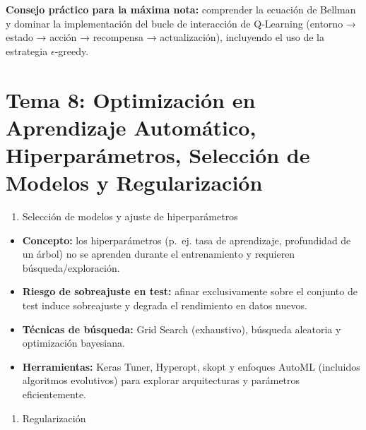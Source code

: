 \documentclass[12pt]{book} %
\providecommand{\tightlist}{%
  \setlength{\itemsep}{0pt}\setlength{\parskip}{0pt}}
\begin{document}
\textbf{Consejo práctico para la máxima nota:} comprender la ecuación de
Bellman y dominar la implementación del bucle de interacción de
Q‑Learning (entorno → estado → acción → recompensa → actualización),
incluyendo el uso de la estrategia \(\epsilon\)‑greedy.

\hypertarget{tema-8-optimizaciuxf3n-en-aprendizaje-automuxe1tico-hiperparuxe1metros-selecciuxf3n-de-modelos-y-regularizaciuxf3n}{%
\section{Tema 8: Optimización en Aprendizaje Automático,
Hiperparámetros, Selección de Modelos y
Regularización}\label{tema-8-optimizaciuxf3n-en-aprendizaje-automuxe1tico-hiperparuxe1metros-selecciuxf3n-de-modelos-y-regularizaciuxf3n}}

\begin{enumerate}
\def\labelenumi{\arabic{enumi}.}
\tightlist
\item
  Selección de modelos y ajuste de hiperparámetros
\end{enumerate}

\begin{itemize}
\tightlist
\item
  \textbf{Concepto:} los hiperparámetros (p.~ej. tasa de aprendizaje,
  profundidad de un árbol) no se aprenden durante el entrenamiento y
  requieren búsqueda/exploración.
\item
  \textbf{Riesgo de sobreajuste en test:} afinar exclusivamente sobre el
  conjunto de test induce sobreajuste y degrada el rendimiento en datos
  nuevos.
\item
  \textbf{Técnicas de búsqueda:} Grid Search (exhaustivo), búsqueda
  aleatoria y optimización bayesiana.
\item
  \textbf{Herramientas:} Keras Tuner, Hyperopt, skopt y enfoques AutoML
  (incluidos algoritmos evolutivos) para explorar arquitecturas y
  parámetros eficientemente.
\end{itemize}

\begin{enumerate}
\def\labelenumi{\arabic{enumi}.}
\setcounter{enumi}{1}
\tightlist
\item
  Regularización
\end{enumerate}
\end{document}
